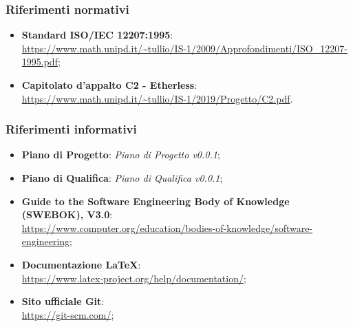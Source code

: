 	\subsubsection{Riferimenti normativi}
	\begin{itemize}
		\item \textbf{Standard ISO/IEC 12207:1995}: \\
		\url{https://www.math.unipd.it/~tullio/IS-1/2009/Approfondimenti/ISO_12207-1995.pdf};
		\item \textbf{Capitolato d'appalto C2 - Etherless}: \\
		\url{https://www.math.unipd.it/~tullio/IS-1/2019/Progetto/C2.pdf}.
	\end{itemize}
	
	
	\subsubsection{Riferimenti informativi}
	\begin{itemize}
		\item \textbf{Piano di Progetto}: \textit{Piano di Progetto v0.0.1};
		\item \textbf{Piano di Qualifica}: \textit{Piano di Qualifica v0.0.1};
		\item \textbf{Guide to the Software Engineering Body of Knowledge (SWEBOK), V3.0}:\\
		\url{https://www.computer.org/education/bodies-of-knowledge/software-engineering};
		\item \textbf{Documentazione LaTeX}: \\
		\url{https://www.latex-project.org/help/documentation/};
		\item \textbf{Sito ufficiale Git}: \\
		\url{https://git-scm.com/};
	\end{itemize}